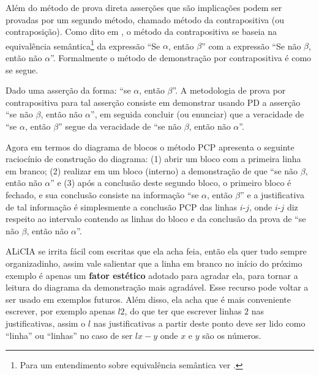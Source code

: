 Além do método de prova direta asserções que são implicações podem ser provadas por um segundo método, chamado método da contrapositiva (ou contraposição). Como dito em \cite{menezes2010MD}, o método da contrapositiva se baseia na equivalência semântica\footnote{Para um entendimento sobre equivalência semântica ver \cite{edgar2002, leonidas2002}.} da expressão ``Se $\alpha$, então $\beta$'' com a expressão ``Se não $\beta$, então não $\alpha$''. Formalmente o método de demonstração por contrapositiva é como se segue.

\begin{definicao}
	Dado uma asserção da forma: ``se $\alpha$, então $\beta$''. A metodologia de prova por contrapositiva para tal asserção consiste em demonstrar usando PD a asserção ``se não $\beta$, então não $\alpha$'', em seguida concluir (ou enunciar) que a veracidade de ``se $\alpha$, então $\beta$'' segue da veracidade de ``se não $\beta$, então não $\alpha$''.
\end{definicao}

Agora em termos do diagrama de blocos o método PCP apresenta o seguinte raciocínio de construção do diagrama: (1) abrir um bloco com a primeira linha em branco; (2) realizar em um bloco (interno) a  demonstração  de que ``se não $\beta$, então não $\alpha$'' e (3) após a conclusão deste segundo bloco, o primeiro bloco é fechado, e sua conclusão consiste na informação ``se $\alpha$, então $\beta$'' e a justificativa de tal informação é simplesmente a conclusão PCP das linhas $i$-$j$, onde $i$-$j$ diz respeito ao intervalo contendo as  linhas do bloco e da conclusão da prova de ``se não $\beta$, então não $\alpha$''.

\begin{cuidado}
  ALiCIA se irrita fácil com escritas que ela acha feia, então ela quer tudo sempre organizadinho, assim vale salientar que a linha em branco no início do próximo exemplo é apenas um \textbf{fator estético} adotado para agradar ela, para tornar a leitura do diagrama da demonstração mais agradável. Esse recurso pode voltar a ser usado em exemplos futuros. Além disso, ela acha que é mais conveniente escrever, por exemplo apenas $l2$, do que ter que escrever linhas $2$ nas justificativas, assim o $l$ nas justificativas a partir deste ponto deve ser lido como ``linha'' ou ``linhas'' no caso de ser $lx-y$ onde $x$ e $y$ são os números.
\end{cuidado}

